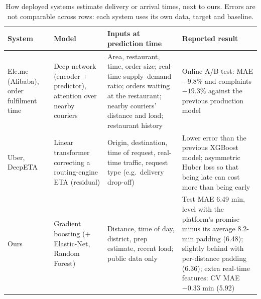 \begin{table}[t]
\centering
\caption{How deployed systems estimate delivery or arrival times, next to ours. Errors are not comparable across
rows: each system uses its own data, target and baseline.}
\label{tab:benchmark}
\footnotesize
\begin{tabular}{@{}p{}p{}p{}p{}@{}}
\toprule
System & Model & Inputs at prediction time & Reported result \\
\midrule
Ele.me (Alibaba), order fulfilment time~\cite{zhu2020fulfillment,alibaba2020fulfillment} &
Deep network (encoder + predictor), attention over nearby couriers &
Area, restaurant, time, order size; real-time supply--demand ratio; orders waiting at the restaurant; nearby
couriers' distance and load; restaurant history &
Online A/B test: MAE $-9.8\%$ and complaints $-19.3\%$ against the previous production model \\
Uber, DeepETA~\cite{uber2022deepeta,hu2022deepreta} &
Linear transformer correcting a routing-engine ETA (residual) &
Origin, destination, time of request, real-time traffic, request type (e.g.\ delivery drop-off) &
Lower error than the previous XGBoost model; asymmetric Huber loss so that being late can cost more than
being early \\
Ours &
Gradient boosting (+ Elastic-Net, Random Forest) &
Distance, time of day, district, prep estimate, recent load; public data only &
Test MAE 6.49 min, level with the platform's promise minus its average 8.2-min padding (6.48); slightly behind with per-distance padding (6.36); extra
real-time features: CV MAE $-0.33$ min (5.92) \\
\bottomrule
\end{tabular}
\end{table}
